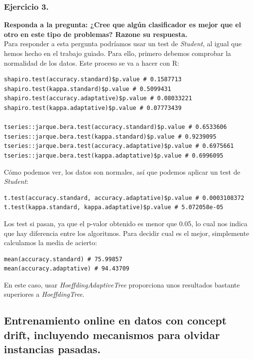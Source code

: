 \documentclass[11pt]{article}
\begin{document}
\subsubsection{Ejercicio 3.}

\textbf{Responda a la pregunta: ¿Cree que algún clasificador es mejor que el otro en este tipo de problemas? Razone su respuesta.} \\

Para responder a esta pergunta podríamos usar un test de \textit{Student}, al igual que hemos hecho en el trabajo guiado. Para ello, primero debemos comprobar la normalidad de los datos. Este proceso se va a hacer con R:

\begin{lstlisting}
shapiro.test(accuracy.standard)$p.value # 0.1587713
shapiro.test(kappa.standard)$p.value # 0.5099431
shapiro.test(accuracy.adaptative)$p.value # 0.08033221
shapiro.test(kappa.adaptative)$p.value # 0.07773439

tseries::jarque.bera.test(accuracy.standard)$p.value # 0.6533606
tseries::jarque.bera.test(kappa.standard)$p.value # 0.9239095
tseries::jarque.bera.test(accuracy.adaptative)$p.value # 0.6975661
tseries::jarque.bera.test(kappa.adaptative)$p.value # 0.6996095
\end{lstlisting}

Cómo podemos ver, los datos son normales, así que podemos aplicar un test de \textit{Student}:

\begin{lstlisting}
t.test(accuracy.standard, accuracy.adaptative)$p.value # 0.0003108372
t.test(kappa.standard, kappa.adaptative)$p.value # 5.072058e-05
\end{lstlisting}

Los test si pasan, ya que el p-valor obtenido es menor que 0.05, lo cual nos indica que hay diferencia entre los algoritmos. Para decidir cual es el mejor, simplemente calculamos la media de acierto:

\begin{lstlisting}
mean(accuracy.standard) # 75.99857
mean(accuracy.adaptative) # 94.43709
\end{lstlisting}

En este caso, usar \textit{HoeffdingAdaptiveTree} proporciona unos resultados bastante superiores a \textit{HoeffdingTree}.

\subsection{Entrenamiento online en datos con concept drift, incluyendo mecanismos para olvidar instancias pasadas.}
\end{document}
